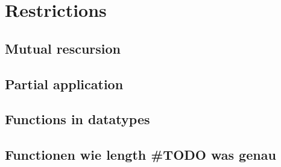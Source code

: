 
\section{Restrictions} \label{chapter:restrictions}

\subsection{Mutual rescursion}
\subsection{Partial application}
\subsection{Functions in datatypes}
\subsection{Functionen wie length \#TODO was genau}
